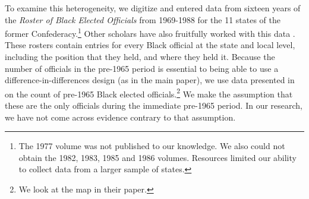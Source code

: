 \documentclass[12pt]{article}
\begin{document}
To examine this heterogeneity, we digitize and entered data from sixteen years of the \emph{Roster of Black Elected Officials} from 1969-1988 for the 11 states of the former Confederacy.\footnote{The 1977 volume was not published to our knowledge.  We also could not obtain the 1982, 1983, 1985 and 1986 volumes.  Resources limited our ability to collect data from a larger sample of states.}  Other scholars have also fruitfully worked with this data . These rosters contain entries for every Black official at the state and local level, including the position that they held, and where they held it.  Because the number of officials in the pre-1965 period is essential to being able to use a difference-in-differences design (as in the main paper), we use data presented in  on the count of pre-1965 Black elected officials.\footnote{We look at the map in their paper.}  We make the assumption that these are the only officials during the immediate pre-1965 period.  In our research, we have not come across evidence contrary to that assumption.
\end{document}
